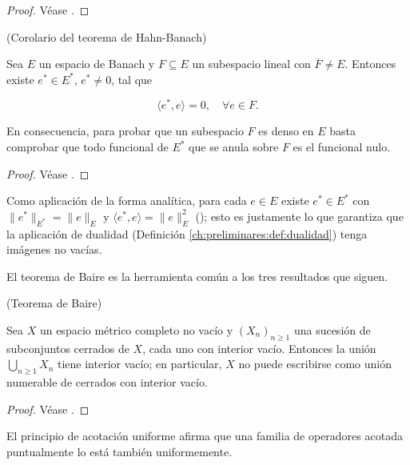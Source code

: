 \begin{proof}
Véase \cite[Teorema~1.1]{brezis-2011-fun-ana-sob}.
\end{proof}

\begin{Corolario}{(Corolario del teorema de Hahn-Banach)}
\label{ch:preliminares:cor:hahnBanach}

Sea $E$ un espacio de Banach y $F \subseteq E$ un subespacio lineal con
$\overline{F} \neq E$. Entonces existe $e^* \in E^*$, $e^* \neq 0$, tal que

\[\langle e^*, e \rangle = 0, \quad \forall e \in F.\]

En consecuencia, para probar que un subespacio $F$ es denso en $E$ basta
comprobar que todo funcional de $E^*$ que se anula sobre $F$ es el funcional nulo.
\end{Corolario}

\begin{proof}
Véase \cite[Corolario~1.8]{brezis-2011-fun-ana-sob}.
\end{proof}

\begin{Observacion}
\label{ch:preliminares:obs:hahnBanachDualidad}
Como aplicación de la forma analítica, para cada $e \in E$ existe $e^* \in E^*$
con $\lVert e^* \rVert_{E^*} = \lVert e \rVert_E$ y
$\langle e^*, e \rangle = \lVert e \rVert_E^2$
(\cite[Corolario~1.3]{brezis-2011-fun-ana-sob}); esto es justamente lo que
garantiza que la aplicación de dualidad
(Definición \ref{ch:preliminares:def:dualidad}) tenga imágenes no vacías.
\end{Observacion}

El teorema de Baire es la herramienta común a los tres resultados que siguen.\\

\begin{Teorema}{(Teorema de Baire)}
\label{ch:preliminares:th:baire}

Sea $X$ un espacio métrico completo no vacío y $(X_n)_{n \geq 1}$ una sucesión de
subconjuntos cerrados de $X$, cada uno con interior vacío. Entonces la unión
$\bigcup_{n \geq 1} X_n$ tiene interior vacío; en particular, $X$ no puede
escribirse como unión numerable de cerrados con interior vacío.
\end{Teorema}

\begin{proof}
Véase \cite[Teorema~2.1]{brezis-2011-fun-ana-sob}.
\end{proof}

El principio de acotación uniforme afirma que una familia de operadores acotada
puntualmente lo está también uniformemente.\\

